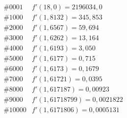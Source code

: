 \documentclass{article}
\begin{document}
		\begin{align*}
			\#0001 & f'(18,0) = 2196034,0\\
			\#1000 & f'( 1,8132) = 345,853\\
			\#2000 & f'( 1,6567) = 59,694\\
			\#3000 & f'( 1,6262) = 13,164\\
			\#4000 & f'( 1,6193) = 3,050\\
			\#5000 & f'( 1,6177) = 0,715\\
			\#6000 & f'( 1,6173) = 0,1679\\
			\#7000 & f'( 1,61721) = 0,0395\\
			\#8000 & f'( 1,617187) = 0,00923\\
			\#9000 & f'( 1,61718799) = 0,0021822\\
			\#10000 & f'(1,6171806) = 0,0005131
		\end{align*}
	
\end{document}
